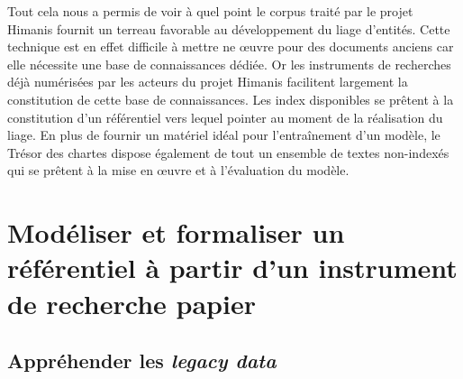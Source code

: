 \documentclass[a4paper,12pt,twoside]{book}
\makeatletter
\newcommand{\parttext}[1]{\def\@parttext{#1}}
\makeatother
\begin{document}
	Tout cela nous a permis de voir à quel point le corpus traité par le projet Himanis fournit un terreau favorable au développement du liage d'entités. Cette technique est en effet difficile à mettre ne œuvre pour des documents anciens car elle nécessite une base de connaissances dédiée. Or les instruments de recherches déjà numérisées par les acteurs du projet Himanis facilitent largement la constitution de cette base de connaissances. Les index disponibles se prêtent à la constitution d'un référentiel vers lequel pointer au moment de la réalisation du liage. En plus de fournir un matériel idéal pour l'entraînement d'un modèle, le Trésor des chartes dispose également de tout un ensemble de textes non-indexés qui se prêtent à la mise en œuvre et à l'évaluation du modèle.
	
	\parttext{L'objectif final du stage que nous avons réalisé étant de préparer l'apprentissage du liage d'entités à partir des données issues du projet Himanis, notre action s'est principalement concentrée sur la création d'un référentiel pouvant servir de base de connaissances. Nous consacrerons donc cette deuxième partie au travail de modélisation et de formalisation de ce référentiel à partir d'un index papier, activité qui a occupé la majeure partie de notre stage. Nous nous sommes concentrés ici sur l'index du premier volume de l'inventaire analytique des registres du Trésor des chartes portant sur les volumes JJ 37 à JJ 50 et paru en 1958. Pour rendre compte de ce travail, nous décrirons dans un premier chapitre les différentes difficultés rencontrées pour comprendre et manipuler cet instrument de recherche. Puis nous dédierons un second chapitre à l'analyse des relations entre les entités. Nous consacrerons enfin un troisième chapitre à la transformation de l'index en une base de données relationnelle.}
	
	\part{Modéliser et formaliser un référentiel à partir d’un instrument de recherche papier}
	
	
	\chapter{Appréhender les \textit{legacy data}}
	
\end{document}
